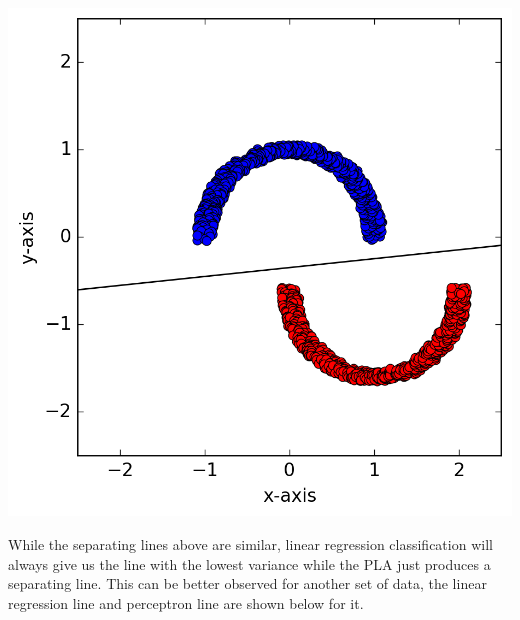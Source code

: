 \documentclass[a4paper]{article}
\begin{document}
\begin {description}
\begin{doublespace}
\begin{enumerate}[(a)]
\begin{center}
\includegraphics[scale=0.65]{Problem_3_1b.png}
\end{center}

While the separating lines above are similar, linear regression classification will always give us the line with the lowest variance while the PLA just produces a separating line. This can be better observed for another set of data, the linear regression line and perceptron line are shown below for it.


\end{enumerate}
\end{doublespace}
\end{description}
\end{document}
